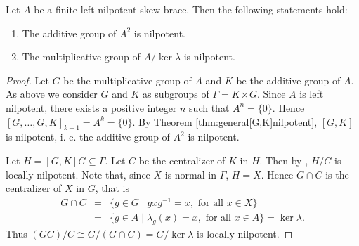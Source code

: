 \begin{theorem}
    \label{thm:A2}
    Let $A$ be a finite left nilpotent skew brace. Then the following statements
    hold:
    \begin{enumerate}
        \item The additive group of $A^2$ is nilpotent.
        \item The multiplicative group of $A/\ker\lambda$ is nilpotent.
    \end{enumerate}
\end{theorem}

\begin{proof} Let $G$ be the multiplicative group of $A$ and $K$ be the additive group of $A$. As above we consider $G$ and $K$ as subgroups of $\Gamma=K\rtimes G$. Since $A$ is left nilpotent, there exists a positive integer $n$ such that $A^n=\{ 0\}$. Hence $[G,\dots ,G,K]_{k-1}=A^k=\{ 0\}$. By Theorem \ref{thm:general[G,K]nilpotent}, $[G,K]$ is nilpotent, i. e. the additive group of $A^2$ is nilpotent.

 Let $H=[G,K]G\subseteq \Gamma$. Let $C$ be the centralizer of $K$ in $H$. Then by
    \cite[Theorem~4]{Hall}, $H/C$ is locally nilpotent. Note
    that, since $X$ is normal in $\Gamma$, $H=X$. Hence $G\cap C$ is the
    centralizer of $X$ in $G$, that is
    \begin{eqnarray*}G\cap C&=&\{ g\in G\mid gxg^{-1}=x, \text{ for all } x\in X\}\\
    &=&\{ g\in A\mid \lambda_g(x)=x, \text{ for all } x\in A\}=\ker\lambda.
    \end{eqnarray*}
     Thus $(GC)/C\cong G/(G\cap
     C)=G/\ker\lambda$ is locally nilpotent.
\end{proof}


